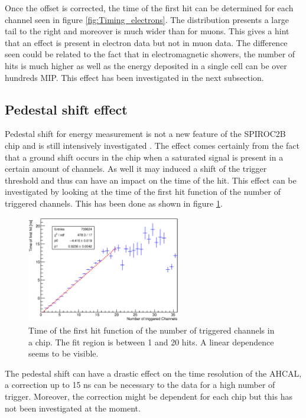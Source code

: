 \documentclass[twoside,a4paper,11pt]{article}
\begin{document}
Once the offset is corrected, the time of the first hit can be determined for each channel seen in figure \ref{fig:Timing_electrons}. The distribution presents a large tail to the right and moreover is much wider than for muons. This gives a hint that an effect is present in electron data but not in muon data. The difference seen could be related to the fact that in electromagnetic showers, the number of hits is much higher as well as the energy deposited in a single cell can be over hundreds MIP. This effect has been investigated in the next subsection. 

\subsection{Pedestal shift effect}
\label{subsec:ped_shift}

Pedestal shift for energy measurement is not a new feature of the SPIROC2B chip and is still intensively investigated \cite{OskarMaster}. The effect comes certainly from the fact that a ground shift occurs in the chip when a saturated signal is present in a certain amount of channels. As well it may induced a shift of the trigger threshold and thus can have an impact on the time of the hit. This effect can be investigated by looking at the time of the first hit function of the number of triggered channels. This has been done as shown in figure \ref{fig:nhits_profile}.
\begin{figure}[htbp]
\begin{center}
\includegraphics[width=0.6\textwidth]{fig/TimeHits_NumberTriggeredChn_Dep.eps}
\caption{Time of the first hit function of the number of triggered channels in a chip. The fit region is between 1 and 20 hits. A linear dependence seems to be visible.}
\label{fig:nhits_profile}
\end{center}
\end{figure}
The pedestal shift can have a drastic effect on the time resolution of the AHCAL, a correction up to 15 ns can be necessary to the data for a high number of trigger. Moreover, the correction might be dependent for each chip but this has not been investigated at the moment.\\
\end{document}
